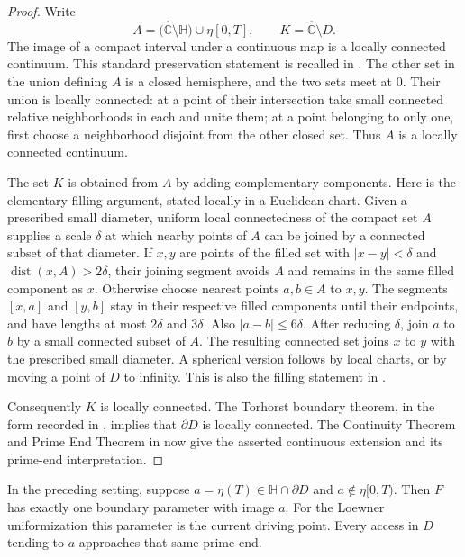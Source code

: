 \begin{proof}
Write
\[
 A=\bigl(\widehat{\mathbb C}\setminus\mathbb H\bigr)
       \cup\eta[0,T],
 \qquad K=\widehat{\mathbb C}\setminus D.
\]
The image of a compact interval under a continuous map is a locally
connected continuum.  This standard preservation statement is recalled in
\cite[Chapter~2, \S2.2, p.~19]{pommerenke1992}.
The other set in the union defining $A$ is a closed hemisphere, and the
two sets meet at $0$.  Their union is locally connected: at a point of
their intersection take small connected relative neighborhoods in each
and unite them; at a point belonging to only one, first choose a
neighborhood disjoint from the other closed set.  Thus $A$ is a locally
connected continuum.

The set $K$ is obtained from $A$ by adding complementary components.
Here is the elementary filling argument, stated locally in a Euclidean
chart.  Given a prescribed small diameter, uniform local connectedness of
the compact set $A$ supplies a scale $\delta$ at which nearby points of
$A$ can be joined by a connected subset of that diameter.  If $x,y$ are
points of the filled set with $|x-y|<\delta$ and
$\operatorname{dist}(x,A)>2\delta$, their joining segment avoids $A$
and remains in the same filled component as $x$.  Otherwise choose
nearest points $a,b\in A$ to $x,y$.  The segments $[x,a]$ and $[y,b]$
stay in their respective filled components until their endpoints, and
have lengths at most $2\delta$ and $3\delta$.  Also
$|a-b|\le6\delta$.  After reducing $\delta$, join $a$ to $b$ by a
small connected subset of $A$.  The resulting connected set joins
$x$ to $y$ with the prescribed small diameter.  A spherical version
follows by local charts, or by moving a point of $D$ to infinity.
This is also the filling statement in
\cite[\S2, Lemma~2.4, p.~7]{loridantluo2017}.

Consequently $K$ is locally connected.  The Torhorst boundary theorem,
in the form recorded in
\cite[\S2, Lemma~2.6, p.~8]{loridantluo2017}, implies that
$\partial D$ is locally connected.  The Continuity Theorem and Prime
End Theorem in \cite[Chapter~2, \S2.1, p.~18]{pommerenke1992} now give
the asserted continuous extension and its prime-end interpretation.
\end{proof}

\begin{lemma}
\label{geom:fresh-tip}
In the preceding setting, suppose
$a=\eta(T)\in\mathbb H\cap\partial D$ and
$a\notin\eta[0,T)$.  Then $F$ has exactly one boundary parameter with
image $a$.  For the Loewner uniformization this parameter is the current
driving point.  Every access in $D$ tending to $a$ approaches that same
prime end.
\end{lemma}

